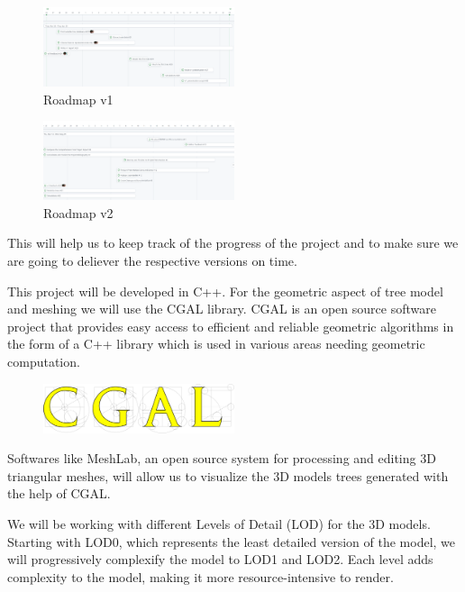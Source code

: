 \documentclass[12pt]{article}
\begin{document}
\begin{figure}[H]
    \centering
    \includegraphics[width=0.5\textwidth]{images/roadmap_v1.png}
    \caption{Roadmap v1}
\end{figure}

\begin{figure}[H]
    \centering
    \includegraphics[width=0.5\textwidth]{images/roadmap_v2.png}
    \caption{Roadmap v2}
\end{figure}

This will help us to keep track of the progress of the project and to make sure
we are going to deliever the respective versions on time.

This project will be developed in C++.
For the geometric aspect of tree model and meshing we will use the CGAL library.
CGAL is an open source software project that provides easy access to efficient
and reliable geometric algorithms in the form of a C++ library which is used
in various areas needing geometric computation.\cite{cgal}

\begin{figure}[H]
    \vspace{1.5cm}
    \centering
    \includegraphics[width=0.5\textwidth]{images/cgal_logo.png}
\end{figure}

Softwares like MeshLab, an open source system for processing and editing 3D
triangular meshes\cite{meshlab}, will allow us to visualize the 3D models trees generated with
the help of CGAL.

We will be working with different Levels of Detail (LOD) for the 3D models.
Starting with LOD0, which represents the least detailed version of the model,
we will progressively complexify the model to LOD1 and LOD2.
Each level adds complexity to the model, making it more
resource-intensive to render.
\end{document}
